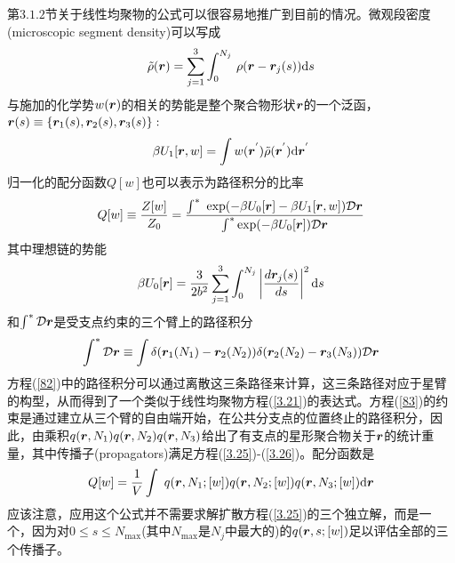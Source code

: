 第$3.1.2$节关于线性均聚物的公式可以很容易地推广到目前的情况。微观段密度(microscopic segment density)可以写成
\begin{equation}
\tilde{\rho}(\bm{r})=\sum_{j=1}^3 \int_{0}^{N_j}\,\rho(\bm{r}-\bm{r}_{j}(s)) \mathrm{d}s
\end{equation}
与施加的化学势$w (\bm{r})$的相关的势能是整个聚合物形状$\bm{r}$的一个泛函，$\bm{r}(s)\equiv \left\{ \bm{r}_1(s),\bm{r}_2(s),\bm{r}_3(s) \right\}:$
\begin{equation}
\beta U_1[\bm{r},w]=\int w(\bm{r}^{'})\tilde{\rho}(\bm{r}^{'})\mathrm{d}\bm{r}^{'}
\end{equation}
归一化的配分函数$Q[w]$也可以表示为路径积分的比率
\begin{equation}
Q[w]\equiv \frac{Z[w]}{Z_0}=\frac{\int^{*}~\exp (-\beta U_0[\bm{r}]-\beta U_1[\bm{r},w])\mathcal{D}\bm{r}}{\int^{*} \exp (-\beta U_0[\bm{r}]) \mathcal{D}\bm{r}} \label{82}
\end{equation}
其中理想链的势能
\begin{equation}
\beta U_0[\bm{r}]=\frac{3}{2b^2}\sum_{j=1}^3\int_{0}^{N_j} \left| \frac{d\bm{r}_j(s)}{ds} \right|^2 \mathrm{d}s
\end{equation}
和$\int^{*}\mathcal{D}\bm{r}$是受支点约束的三个臂上的路径积分
\begin{equation}
\int^{*}\mathcal{D}\bm{r}\equiv \int \delta (\bm{r}_1(N_1)-\bm{r}_2(N_2))\delta (\bm{r}_2(N_2)-\bm{r}_3(N_3)) \mathcal{D}\bm{r}  \label{83}
\end{equation}
方程(\ref{82})中的路径积分可以通过离散这三条路径来计算，这三条路径对应于星臂的构型，从而得到了一个类似于线性均聚物方程(\ref{3.21})的表达式。方程(\ref{83})的约束是通过建立从三个臂的自由端开始，在公共分支点的位置终止的路径积分，因此，由乘积$q(\bm{r},N_1)q(\bm{r},N_2)q(\bm{r},N_3)$给出了有支点的星形聚合物关于$\bm{r}$的统计重量，其中传播子(propagators)满足方程(\ref{3.25})-(\ref{3.26})。配分函数是
\begin{equation}
Q[w]=\frac{1}{V}\int ~q(\bm{r},N_1;[w])q(\bm{r},N_2;[w])q(\bm{r},N_3;[w]) \mathrm{d}\bm{r}
\end{equation}
应该注意，应用这个公式并不需要求解扩散方程(\ref{3.25})的三个独立解，而是一个，因为对$0\leq s\leq N_{\max}$(其中$N_{\max}$是$N_j$中最大的)的$q(\bm{r},s;[w])$足以评估全部的三个传播子。

